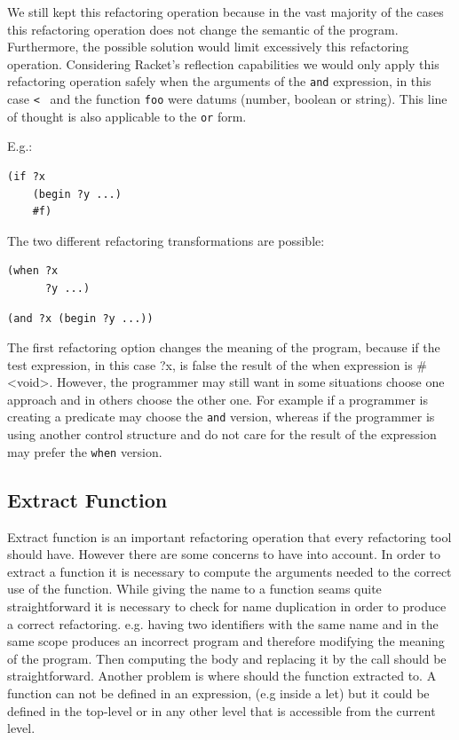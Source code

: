 We still kept this refactoring operation because in the vast majority
of the cases this refactoring operation does not change the semantic of the program.
Furthermore, the possible solution would limit excessively this refactoring operation.  %
Considering Racket's reflection capabilities we would only apply this refactoring operation
safely when the arguments of the {\tt and} expression, in this case {\tt < } and the function {\tt foo}
 were datums (number, boolean or string). This line of thought is also applicable to
 the {\tt or} form.


E.g.:
\begin{lstlisting}[basicstyle=\ttfamily, caption="Code sample"]
(if ?x
    (begin ?y ...)
    #f)
\end{lstlisting}
The two different refactoring transformations are possible:
\begin{lstlisting}[basicstyle=\ttfamily, caption="Refactoring option 1"]
(when ?x
      ?y ...)
\end{lstlisting}

\begin{lstlisting}[basicstyle=\ttfamily, caption="Refactoring option 2"]
(and ?x (begin ?y ...))
\end{lstlisting}

The first refactoring option changes the meaning of the program, because if the
test expression, in this case ?x, is false the result of the when expression is \#<void>.
However, the programmer may still want in some situations choose one approach and in others
choose the other one. For example if a programmer is creating a predicate may
choose the {\tt and} version, whereas if the programmer is using another control structure
and do not care for the result of the expression may prefer the {\tt when} version.

\subsection{Extract Function}
Extract function is an important refactoring operation that every refactoring tool
should have.
However there are some concerns to have into account.
In order to extract a function it is necessary to compute the arguments needed
to the correct use of the function.
While giving the name to a function seams quite straightforward it is necessary to
check for name duplication in order to produce a correct refactoring. e.g. having
two identifiers with the same name and in the same scope produces an incorrect program
and therefore modifying the meaning of the program.
Then computing the body and replacing it by the call should be straightforward.
Another problem is where should the function extracted to. A function can not
be defined in an expression, (e.g inside a let) but it could be defined in the top-level
or in any other level that is accessible from the current level.

